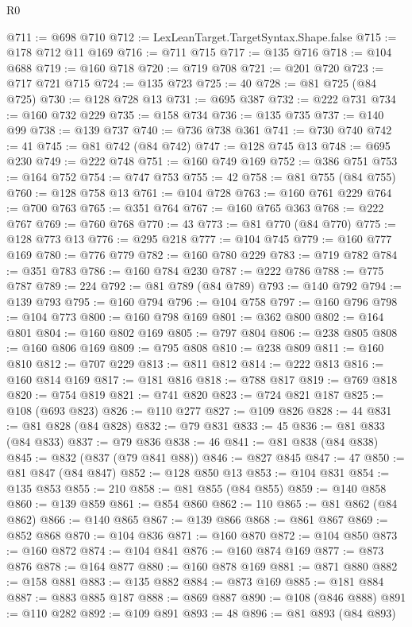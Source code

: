 \begin{lexlean}{R0}
\begin{coremodule}
@711 := @698 @710
@712 := LexLeanTarget.TargetSyntax.Shape.false
@715 := @178 @712 @11 @169
@716 := @711 @715
@717 := @135 @716
@718 := @104 @688
@719 := @160 @718
@720 := @719 @708
@721 := @201 @720
@723 := @717 @721 @715
@724 := @135 @723
@725 := 40
@728 := @81 @725 (@84 @725)
@730 := @128 @728 @13
@731 := @695 @387
@732 := @222 @731
@734 := @160 @732 @229
@735 := @158 @734
@736 := @135 @735
@737 := @140 @99
@738 := @139 @737
@740 := @736 @738 @361
@741 := @730 @740
@742 := 41
@745 := @81 @742 (@84 @742)
@747 := @128 @745 @13
@748 := @695 @230
@749 := @222 @748
@751 := @160 @749 @169
@752 := @386 @751
@753 := @164 @752
@754 := @747 @753
@755 := 42
@758 := @81 @755 (@84 @755)
@760 := @128 @758 @13
@761 := @104 @728
@763 := @160 @761 @229
@764 := @700 @763
@765 := @351 @764
@767 := @160 @765 @363
@768 := @222 @767
@769 := @760 @768
@770 := 43
@773 := @81 @770 (@84 @770)
@775 := @128 @773 @13
@776 := @295 @218
@777 := @104 @745
@779 := @160 @777 @169
@780 := @776 @779
@782 := @160 @780 @229
@783 := @719 @782
@784 := @351 @783
@786 := @160 @784 @230
@787 := @222 @786
@788 := @775 @787
@789 := 224
@792 := @81 @789 (@84 @789)
@793 := @140 @792
@794 := @139 @793
@795 := @160 @794
@796 := @104 @758
@797 := @160 @796
@798 := @104 @773
@800 := @160 @798 @169
@801 := @362 @800
@802 := @164 @801
@804 := @160 @802 @169
@805 := @797 @804
@806 := @238 @805
@808 := @160 @806 @169
@809 := @795 @808
@810 := @238 @809
@811 := @160 @810
@812 := @707 @229
@813 := @811 @812
@814 := @222 @813
@816 := @160 @814 @169
@817 := @181 @816
@818 := @788 @817
@819 := @769 @818
@820 := @754 @819
@821 := @741 @820
@823 := @724 @821 @187
@825 := @108 (@693 @823)
@826 := @110 @277
@827 := @109 @826
@828 := 44
@831 := @81 @828 (@84 @828)
@832 := @79 @831
@833 := 45
@836 := @81 @833 (@84 @833)
@837 := @79 @836
@838 := 46
@841 := @81 @838 (@84 @838)
@845 := @832 (@837 (@79 @841 @88))
@846 := @827 @845
@847 := 47
@850 := @81 @847 (@84 @847)
@852 := @128 @850 @13
@853 := @104 @831
@854 := @135 @853
@855 := 210
@858 := @81 @855 (@84 @855)
@859 := @140 @858
@860 := @139 @859
@861 := @854 @860
@862 := 110
@865 := @81 @862 (@84 @862)
@866 := @140 @865
@867 := @139 @866
@868 := @861 @867
@869 := @852 @868
@870 := @104 @836
@871 := @160 @870
@872 := @104 @850
@873 := @160 @872
@874 := @104 @841
@876 := @160 @874 @169
@877 := @873 @876
@878 := @164 @877
@880 := @160 @878 @169
@881 := @871 @880
@882 := @158 @881
@883 := @135 @882
@884 := @873 @169
@885 := @181 @884
@887 := @883 @885 @187
@888 := @869 @887
@890 := @108 (@846 @888)
@891 := @110 @282
@892 := @109 @891
@893 := 48
@896 := @81 @893 (@84 @893)

\end{coremodule}
\end{lexlean}

